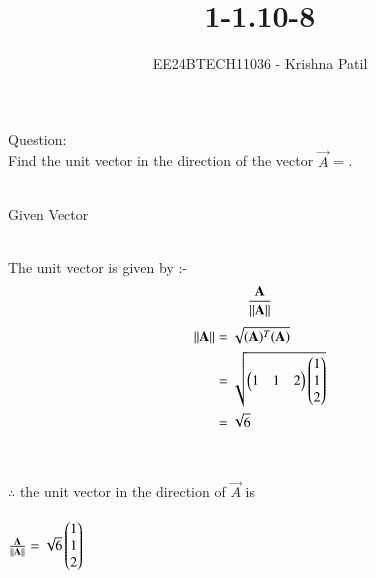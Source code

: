 \documentclass[journal]{IEEEtran}
\begin{document}

\vspace{3cm}

\title{1-1.10-8}
\author{EE24BTECH11036 - Krishna Patil}
{\let\newpage\relax\maketitle}
Question:\\
Find the unit vector in the direction of the vector  $\vec{A}$ = . 
\\ \\
\solution
\begin{table}[h!]    
  \centering
  
  \caption{Given Vector}
  \label{tab1-1.9-6}
\end{table}\\
The unit vector is given by :-
\begin{align}
	\frac{\mathbf{A}}{\left\lVert\mathbf{A}\right\rVert}
\end{align}
\begin{align}
	\left\lVert\mathbf{A}\right\rVert &= \sqrt{(\mathbf{A})^T(\mathbf{A})}\\
	&= \sqrt{\begin{pmatrix}1 & 1 & 2\end{pmatrix}\begin{pmatrix}1\\1\\2\end{pmatrix}}\\
	&= \sqrt{6} 
\end{align}
\\ \\
$\therefore$ the unit vector in the direction of $\vec{A}$ is \\ \\
\centering
$\frac{\mathbf{A}}{\left\lVert\mathbf{A}\right\rVert} = \sqrt{6} \begin{pmatrix}1\\1\\2\end{pmatrix}$ \\
\end{document}
